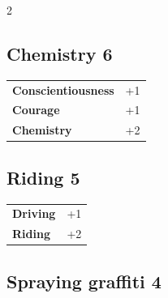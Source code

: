 \begin{multicols}{2}
\begin{tcolorbox}
\end{tcolorbox}

\begin{tcolorbox}
    \subsection*{Chemistry \hfill \small{6 }}
    \tcblower




\begin{tabular}{@{}ll@{}}
    \textbf{Conscientiousness} & +1\\
    \textbf{Courage} & +1\\
    \textbf{Chemistry} & +2\\
\end{tabular}


\end{tcolorbox}

\begin{tcolorbox}
    \subsection*{Riding \hfill \small{5 }}
    \tcblower




\begin{tabular}{@{}ll@{}}
    \textbf{Driving} & +1\\
    \textbf{Riding} & +2\\
\end{tabular}


\end{tcolorbox}

\begin{tcolorbox}
    \subsection*{Spraying graffiti \hfill \small{4 }}
    \tcblower





\end{tcolorbox}
\end{multicols}
